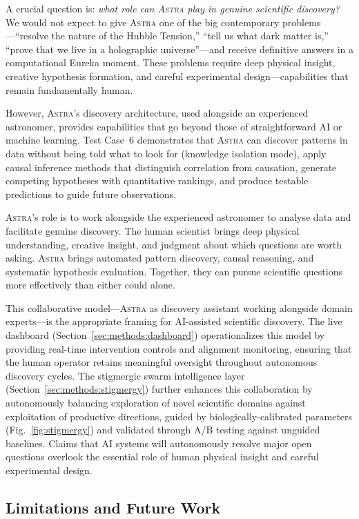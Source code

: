 \documentclass[usenatbib]{rasti}
\newcommand{\astra}{\textsc{Astra}\xspace}
\begin{document}
A crucial question is: \emph{what role can \astra play in genuine scientific discovery?}
We would not expect to give \astra one of the big contemporary problems---``resolve the nature of the Hubble Tension,'' ``tell us what dark matter is,'' ``prove that we live in a holographic universe''---and receive definitive answers in a computational Eureka moment.
These problems require deep physical insight, creative hypothesis formation, and careful experimental design---capabilities that remain fundamentally human.

However, \astra's discovery architecture, used alongside an experienced astronomer, provides capabilities that go beyond those of straightforward AI or machine learning.
Test Case~6 demonstrates that \astra can discover patterns in data without being told what to look for (knowledge isolation mode), apply causal inference methods that distinguish correlation from causation, generate competing hypotheses with quantitative rankings, and produce testable predictions to guide future observations.

\astra's role is to work alongside the experienced astronomer to analyse data and facilitate genuine discovery.
The human scientist brings deep physical understanding, creative insight, and judgment about which questions are worth asking.
\astra brings automated pattern discovery, causal reasoning, and systematic hypothesis evaluation.
Together, they can pursue scientific questions more effectively than either could alone.

This collaborative model---\astra as discovery assistant working alongside domain experts---is the appropriate framing for AI-assisted scientific discovery.
The live dashboard (Section~\ref{sec:methods:dashboard}) operationalizes this model by providing real-time intervention controls and alignment monitoring, ensuring that the human operator retains meaningful oversight throughout autonomous discovery cycles.
The stigmergic swarm intelligence layer (Section~\ref{sec:methods:stigmergy}) further enhances this collaboration by autonomously balancing exploration of novel scientific domains against exploitation of productive directions, guided by biologically-calibrated parameters (Fig.~\ref{fig:stigmergy}) and validated through A/B testing against unguided baselines.
Claims that AI systems will autonomously resolve major open questions overlook the essential role of human physical insight and careful experimental design.

\subsection{Limitations and Future Work}
\label{sec:discussion:limitations}
\end{document}
